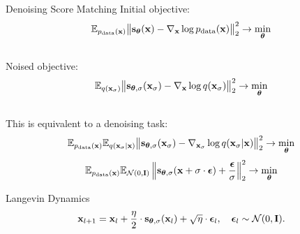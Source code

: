 \documentclass{beamer}
\begin{document}
\begin{frame}{Denoising Score Matching}
	Initial objective:
	\vspace{-0.2cm}
	\[
		\mathbb{E}_{p_{\text{data}}(\mathbf{x})}\big\| \mathbf{s}_{\boldsymbol{\theta}}(\mathbf{x}) - \nabla_{\mathbf{x}} \log p_{\text{data}}(\mathbf{x}) \big\|^2_2 \rightarrow \min_{\boldsymbol{\theta}}
	\]
	\eqpause
	\vspace{-0.5cm} \\
	Noised objective:
	\vspace{-0.2cm}
	\[
		\mathbb{E}_{q(\mathbf{x}_{\sigma})}\big\| \mathbf{s}_{\boldsymbol{\theta}, \sigma}(\mathbf{x}_\sigma) - \nabla_{\mathbf{x}} \log q(\mathbf{x}_{\sigma}) \big\|^2_2 \rightarrow \min_{\boldsymbol{\theta}}
	\]
	\eqpause
	\vspace{-0.5cm} \\
	This is equivalent to a denoising task:
	\vspace{-0.2cm}
	\[
		\mathbb{E}_{p_{\text{data}}(\mathbf{x})} \mathbb{E}_{q(\mathbf{x}_{\sigma} | \mathbf{x})}\big\| \mathbf{s}_{\boldsymbol{\theta}, \sigma}(\mathbf{x}_{\sigma}) - \nabla_{\mathbf{x}_{\sigma}} \log q(\mathbf{x}_{\sigma} | \mathbf{x}) \big\|^2_2 \rightarrow \min_{\boldsymbol{\theta}}
	\]
	\eqpause
	\vspace{-0.3cm}
	\[
		\mathbb{E}_{p_{\text{data}}(\mathbf{x})} \mathbb{E}_{\mathcal{N}(0, \mathbf{I})}\left\| \mathbf{s}_{\boldsymbol{\theta}, \sigma}(\mathbf{x} + \sigma \cdot \boldsymbol{\epsilon}) + \frac{\boldsymbol{\epsilon}}{\sigma} \right\|^2_2 \rightarrow \min_{\boldsymbol{\theta}}
	\]
	\vspace{-0.5cm}
	\begin{block}{Langevin Dynamics}
		\vspace{-0.3cm}
		\[
			\mathbf{x}_{l + 1} = \mathbf{x}_l + \frac{\eta}{2} \cdot \mathbf{s}_{\boldsymbol{\theta}, \sigma}(\mathbf{x}_l) + \sqrt{\eta} \cdot \boldsymbol{\epsilon}_l, \quad \boldsymbol{\epsilon}_l \sim \mathcal{N}(0, \mathbf{I}).
		\]
		\vspace{-0.7cm}
	\end{block}
\end{frame}
\end{document}
